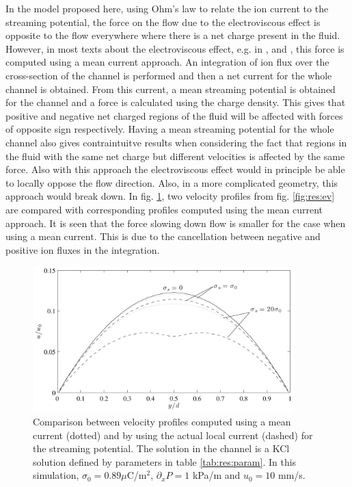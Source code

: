 In the model proposed here, using Ohm's law to relate the ion current
to the streaming potential, the force on the flow due to the
electroviscous effect is opposite to the flow everywhere where there
is a net charge present in the fluid. However, in most texts about the
electroviscous effect, e.g. in \cite{dongquing-ren-book},
\cite{wang-poi} and \cite{ren-elvis-paper}, this force is computed
using a mean current approach. An integration of ion flux over the
cross-section of the channel is performed and then a net current for
the whole channel is obtained. From this current, a mean streaming
potential is obtained for the channel and a force is calculated using
the charge density. This gives that positive and negative net charged
regions of the fluid will be affected with forces of opposite sign
respectively. Having a mean streaming potential for the whole channel
also gives contraintuitve results when considering the fact that
regions in the fluid with the same net charge but different velocities
is affected by the same force. Also with this approach the
electroviscous effect would in principle be able to locally oppose the
flow direction. Also, in a more complicated geometry, this approach
would break down. In fig. \ref{fig:res:ev_comp}, two velocity profiles
from fig. \ref{fig:res:ev} are compared with corresponding profiles
computed using the mean current approach. It is seen that the
force slowing down flow is smaller for the case when using a mean
current. This is due to the cancellation between negative and
positive ion fluxes in the integration.

\begin{figure}
\begin{center}
\includegraphics[width=0.9\textwidth]{fig/electrovisc_comp.pdf}
\end{center}
\caption{Comparison between velocity profiles computed using a mean
  current (dotted) and by using the actual local current (dashed) for
  the streaming potential. The solution in the channel is a KCl
  solution defined by parameters in table \ref{tab:res:param}. In this
  simulation, $\sigma_0 = 0.89 \mu$C/m$^2$, $\partial_xP = 1$ kPa/m
  and $u_0 = 10$ mm/s. }
\label{fig:res:ev_comp}
\end{figure}
